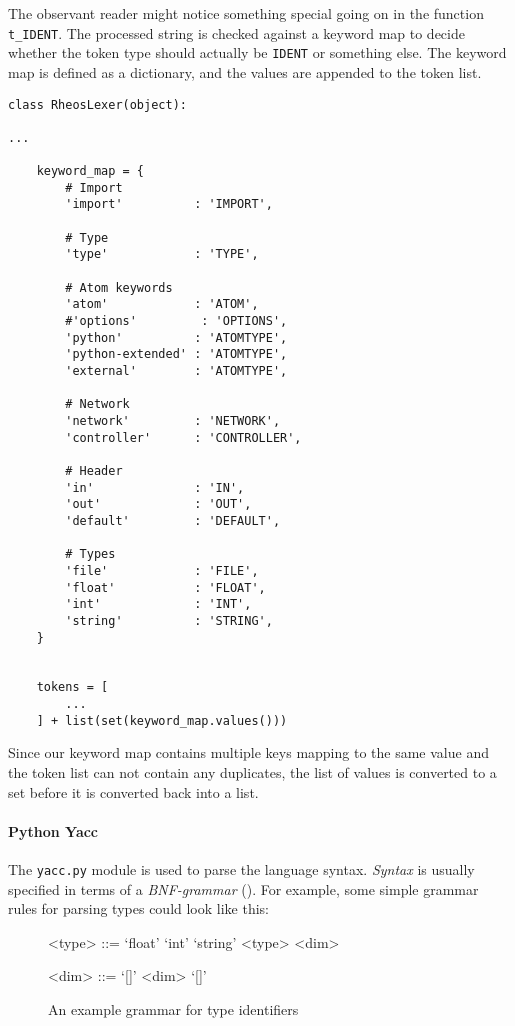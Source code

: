 The observant reader might notice something special going on in the
function \texttt{t_IDENT}. The processed string is checked against a
keyword map to decide whether the token type should actually be
\texttt{IDENT} or something else. The keyword map is defined as a
dictionary, and the values are appended to the token list.

\begin{lstlisting}
class RheosLexer(object):

...

    keyword_map = {
        # Import
        'import'          : 'IMPORT',

        # Type
        'type'            : 'TYPE',

        # Atom keywords
        'atom'            : 'ATOM',
        #'options'         : 'OPTIONS',
        'python'          : 'ATOMTYPE',
        'python-extended' : 'ATOMTYPE',
        'external'        : 'ATOMTYPE',

        # Network
        'network'         : 'NETWORK',
        'controller'      : 'CONTROLLER',
                
        # Header
        'in'              : 'IN',
        'out'             : 'OUT',
        'default'         : 'DEFAULT',
        
        # Types
        'file'            : 'FILE',
        'float'           : 'FLOAT',
        'int'             : 'INT',
        'string'          : 'STRING',
    }


    tokens = [
        ...
    ] + list(set(keyword_map.values()))
\end{lstlisting}

\noindent Since our keyword map contains multiple keys mapping to the
same value and the token list can not contain any duplicates, the list
of values is converted to a set before it is converted back into a
list.


\paragraph{Python Yacc}
The \texttt{yacc.py} module is used to parse the language
syntax. \emph{Syntax} is usually specified in terms of a
\emph{BNF-grammar} (). For example, some
simple grammar rules for parsing types could look like this:

\begin{figure}[h!]
  \begin{grammar}
    <type> ::= `float'
    \alt `int'
    \alt `string'
    \alt <type> <dim>

    <dim> ::= `[]'
    \alt <dim> `[]'
  \end{grammar}
  \caption{An example grammar for type identifiers}
  \label{grammar:typeex}
\end{figure}

